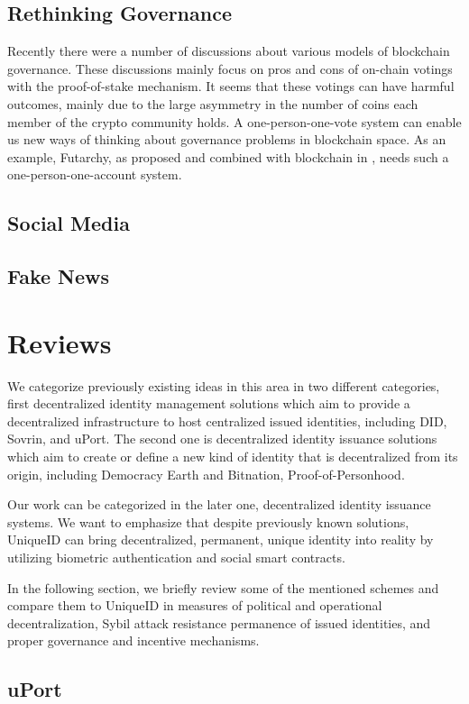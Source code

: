 \documentclass[conference]{IEEEtran}
\begin{document}
\subsection{Rethinking Governance}
Recently there were a number of discussions about various models of blockchain governance. These discussions mainly focus on pros and cons of on-chain votings with the proof-of-stake mechanism. It seems that these votings can have harmful outcomes, mainly due to the large asymmetry in the number of coins each member of the crypto community holds. A one-person-one-vote system can enable us new ways of thinking about governance problems in blockchain space. As an example, Futarchy, as proposed and combined with blockchain in \cite{Futarchy}, needs such a one-person-one-account system. 

\subsection{Social Media}
\subsection{Fake News}

\section{Reviews}
We categorize previously existing ideas in this area in two different categories, first decentralized identity management solutions which aim to provide a decentralized infrastructure to host centralized issued identities, including DID, Sovrin, and uPort. The second one is decentralized identity issuance solutions which aim to create or define a new kind of identity that is decentralized from its origin, including Democracy Earth and Bitnation, Proof-of-Personhood.


Our work can be categorized in the later one, decentralized identity issuance systems. We want to emphasize that despite previously known solutions, UniqueID can bring decentralized, permanent, unique identity into reality by utilizing biometric authentication and social smart contracts. 


In the following section, we briefly review some of the mentioned schemes and compare them to UniqueID in measures of political and operational decentralization, Sybil attack resistance permanence of issued identities, and proper governance and incentive mechanisms. 

\subsection{uPort}
\end{document}
